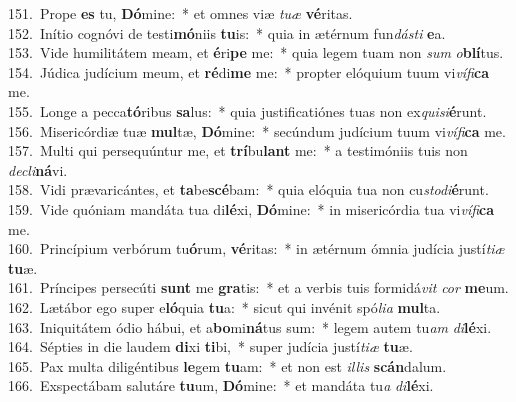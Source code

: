 {151.~}Prope \textbf{es} tu, \textbf{Dó}mine:~* et omnes viæ \textit{tu}\textit{æ} \textbf{vé}ritas.\\
{152.~}Inítio cognóvi de testi\textbf{mó}niis \textbf{tu}is:~* quia in ætérnum fun\textit{dá}\textit{sti} \textbf{e}a.\\
{153.~}Vide humilitátem meam, et \textbf{é}ri\textbf{pe} me:~* quia legem tuam non \textit{sum} \textit{o}\textbf{blí}tus.\\
{154.~}Júdica judícium meum, et \textbf{ré}di\textbf{me} me:~* propter elóquium tuum vi\textit{ví}\textit{fi}\textbf{ca} me.\\
{155.~}Longe a pecca\textbf{tó}ribus \textbf{sa}lus:~* quia justificatiónes tuas non ex\textit{qui}\textit{si}\textbf{é}runt.\\
{156.~}Misericórdiæ tuæ \textbf{mul}tæ, \textbf{Dó}mine:~* secúndum judícium tuum vi\textit{ví}\textit{fi}\textbf{ca} me.\\
{157.~}Multi qui persequúntur me, et \textbf{trí}bu\textbf{lant} me:~* a testimóniis tuis non \textit{de}\textit{cli}\textbf{ná}vi.\\
{158.~}Vidi prævaricántes, et \textbf{ta}be\textbf{scé}bam:~* quia elóquia tua non cu\textit{sto}\textit{di}\textbf{é}runt.\\
{159.~}Vide quóniam mandáta tua di\textbf{lé}xi, \textbf{Dó}mine:~* in misericórdia tua vi\textit{ví}\textit{fi}\textbf{ca} me.\\
{160.~}Princípium verbórum tu\textbf{ó}rum, \textbf{vé}ritas:~* in ætérnum ómnia judícia justí\textit{ti}\textit{æ} \textbf{tu}æ.\\
{161.~}Príncipes persecúti \textbf{sunt} me \textbf{gra}tis:~* et a verbis tuis formidá\textit{vit} \textit{cor} \textbf{me}um.\\
{162.~}Lætábor ego super e\textbf{ló}quia \textbf{tu}a:~* sicut qui invénit spó\textit{li}\textit{a} \textbf{mul}ta.\\
{163.~}Iniquitátem ódio hábui, et a\textbf{bo}mi\textbf{ná}tus sum:~* legem autem tu\textit{am} \textit{di}\textbf{lé}xi.\\
{164.~}Sépties in die laudem \textbf{di}xi \textbf{ti}bi,~* super judícia justí\textit{ti}\textit{æ} \textbf{tu}æ.\\
{165.~}Pax multa diligéntibus \textbf{le}gem \textbf{tu}am:~* et non est \textit{il}\textit{lis} \textbf{scán}dalum.\\
{166.~}Exspectábam salutáre \textbf{tu}um, \textbf{Dó}mine:~* et mandáta tu\textit{a} \textit{di}\textbf{lé}xi.\\
